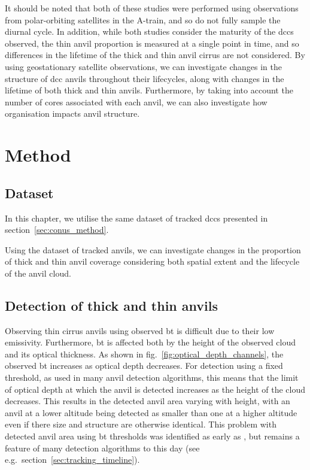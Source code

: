 It should be noted that both of these studies were performed using observations from polar-orbiting satellites in the A-train, and so do not fully sample the diurnal cycle.
In addition, while both studies consider the maturity of the \acrshort{dcc}s observed, the thin anvil proportion is measured at a single point in time, and so differences in the lifetime of the thick and thin anvil cirrus are not considered.
By using geostationary satellite observations, we can investigate changes in the structure of \acrshort{dcc} anvils throughout their lifecycles, along with changes in the lifetime of both thick and thin anvils.
Furthermore, by taking into account the number of cores associated with each anvil, we can also investigate how organisation impacts anvil structure.


\section{Method}

\subsection{Dataset}

In this chapter, we utilise the same dataset of tracked \acrshort{dcc}s presented in section~\ref{sec:conus_method}.

Using the dataset of tracked anvils, we can investigate changes in the proportion of thick and thin anvil coverage considering both spatial extent and the lifecycle of the anvil cloud.


\subsection{Detection of thick and thin anvils}

Observing thin cirrus anvils using observed \acrshort{bt} is difficult due to their low emissivity.
Furthermore, \acrshort{bt} is affected both by the height of the observed cloud and its optical thickness.
As shown in fig.~\ref{fig:optical_depth_channels}, the observed \acrshort{bt} increases as optical depth decreases.
For detection using a fixed threshold, as used in many anvil detection algorithms, this means that the limit of optical depth at which the anvil is detected increases as the height of the cloud decreases.
This results in the detected anvil area varying with height, with an anvil at a lower altitude being detected as smaller than one at a higher altitude even if there size and structure are otherwise identical.
This problem with detected anvil area using \acrshort{bt} thresholds was identified as early as \citet{augustine_mesoscale_1988}, but remains a feature of many detection algorithms to this day (see e.g.\ section~\ref{sec:tracking_timeline}).

